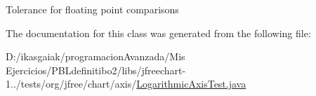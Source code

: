 Tolerance for floating point comparisons 

The documentation for this class was generated from the following file\+:\begin{DoxyCompactItemize}
\item 
D\+:/ikasgaiak/programacion\+Avanzada/\+Mis Ejercicios/\+P\+B\+Ldefinitibo2/libs/jfreechart-\/1../tests/org/jfree/chart/axis/\mbox{\hyperlink{_logarithmic_axis_test_8java}{Logarithmic\+Axis\+Test.\+java}}\end{DoxyCompactItemize}

